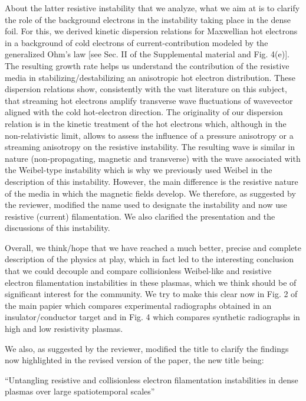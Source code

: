 \documentclass[aps,showpacs,superscriptaddress]{revtex4}%
\begin{document}
\begin{enumerate}
About the latter resistive instability that we analyze, what we aim at is to clarify the role of the background electrons in the  instability taking place in the dense foil.
For this, 
we derived kinetic dispersion relations for Maxwellian hot electrons in a background of cold electrons of current-contribution modeled by the generalized Ohm's law [see Sec. II of the Supplemental material and Fig. 4(e)]. 
The resulting growth rate helps us understand the contribution of the resistive media in stabilizing/destabilizing an anisotropic hot electron distribution. These dispersion relations show, consistently with the vast literature on this subject,  that streaming hot electrons amplify transverse wave fluctuations of wavevector aligned with the cold hot-electron direction. 
The originality of our dispersion relation is in the kinetic treatment of the hot electrons which, although in the non-relativistic limit, allows to assess the influence of a pressure anisotropy or a streaming anisotropy  on the resistive instability. 
The resulting wave is  similar in nature  (non-propagating, magnetic and transverse)  with the wave associated with the Weibel-type instability which is why we previously used Weibel in the description of this instability.  
However,  the main difference is the resistive nature of the media in which the magnetic fields  develop.  We therefore, as suggested by the reviewer, modified the name used to designate the instability and now use resistive (current) filamentation. We also clarified the presentation and the discussions of this instability.

Overall, we think/hope that  we have reached a much better, precise and complete description of the physics at play, which in fact led to the interesting conclusion that we could decouple and compare collisionless Weibel-like and resistive electron filamentation instabilities in these plasmas, which we think should be of significant interest for the community.
We try to make this clear now in Fig. 2  of the main papier which compares experimental radiographs obtained in an  insulator/conductor target and in Fig. 4 which compares synthetic radiographs in high and low resistivity plasmas.

We also, as suggested by the reviewer, modified the title to clarify the findings now highlighted in the revised version of the paper, the new title being:

“Untangling resistive and collisionless electron filamentation instabilities in dense plasmas over large spatiotemporal scales”



\end{enumerate}
\end{document}
